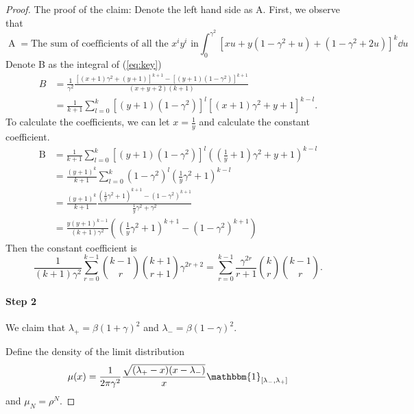\begin{proof}
    The proof of the claim: 
    Denote the left hand side as A. First, we observe that
    \begin{equation}
        \label{eq:key}
        \operatorname{A} = \text{The sum of coefficients of all the }x^iy^i \text{ in} \int_{0}^{\gamma^2} [xu+y(1-\gamma^2 +u)+(1-\gamma^2+2u)]^k\dd u
    \end{equation}
    Denote B as the integral of (\ref{eq:key})
    \begin{align*}
        B &= \frac{1}{\gamma^2}\frac{[(x+1)\gamma^2+(y+1)]^{k+1} - [(y+1)(1-\gamma^2)]^{k+1}}{(x+y+2)(k+1)}\\
        &=\frac{1}{k+1}\sum_{l=0}^k [(y+1)(1-\gamma^2)]^l [(x+1)\gamma^2+y+1]^{k-l}.
    \end{align*}
    To calculate the coefficients, we can let $x = \frac{1}{y}$ and calculate the constant coefficient.
    \begin{align*}
        \operatorname{B} &= \frac{1}{k+1} \sum_{l=0}^k [(y+1) (1-\gamma^2)]^l
        \left(\left(\frac{1}{y}+1\right)\gamma^2 + y+1\right)^{k-l}\\
        &=\frac{(y+1)^k}{k+1}
        \sum_{l=0}^k(1-\gamma^2)^l(\frac{1}{y}\gamma^2+1)^{k-l}\\
        &=\frac{(y+1)^k}{k+1} \frac{(\frac{1}{y}\gamma^2+1)^{k+1} - (1-\gamma^2)^{k+1}}
        {\frac{1}{y}\gamma^2 + \gamma^2}\\
        &=\frac{y(y+1)^{k-1}}{(k+1)\gamma^2} \left(\left(\frac{1}{y}\gamma^2+1\right)^{k+1} - (1-\gamma^2)^{k+1}\right)
    \end{align*}
    Then the constant coefficient is
    \[
    \frac{1}{(k+1)\gamma^2} \sum_{r=0}^{k-1} \binom{k-1}{r} \binom{k+1}{r+1} \gamma^{2r+2} = \sum_{r=0}^{k-1} \frac{\gamma^{2r}}{r+1} \binom{k}{r} \binom{k-1}{r}.
    \]
    
    \paragraph{Step 2} We claim that $\lambda_{+} = \beta(1+\gamma)^2$ and $\lambda_{-} = \beta(1-\gamma)^2$.
    
    Define the density of the limit distribution
    \[
    \mu(x) = \frac{1}{2\pi\gamma^2}\frac{\sqrt{(\lambda_{+}-x)(x-\lambda_{-})}}{x} \mathbbm{1}_{[\lambda_{-}, \lambda_{+}]}
    \]
    and $\mu_N = \rho^N$.
    

\end{proof}
